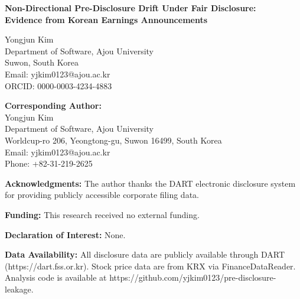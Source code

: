 \documentclass[12pt]{article}
\begin{document}
\begin{center}
{\Large\bfseries Non-Directional Pre-Disclosure Drift Under Fair Disclosure:\\Evidence from Korean Earnings Announcements}

\vspace{2cm}

{\large Yongjun Kim}\\[0.5cm]
Department of Software, Ajou University\\
Suwon, South Korea\\
Email: yjkim0123@ajou.ac.kr\\
ORCID: 0000-0003-4234-4883

\vspace{2cm}

\textbf{Corresponding Author:}\\
Yongjun Kim\\
Department of Software, Ajou University\\
Worldcup-ro 206, Yeongtong-gu, Suwon 16499, South Korea\\
Email: yjkim0123@ajou.ac.kr\\
Phone: +82-31-219-2625

\end{center}

\vfill

\noindent\textbf{Acknowledgments:} The author thanks the DART electronic disclosure system for providing publicly accessible corporate filing data.

\noindent\textbf{Funding:} This research received no external funding.

\noindent\textbf{Declaration of Interest:} None.

\noindent\textbf{Data Availability:} All disclosure data are publicly available through DART (https://dart.fss.or.kr). Stock price data are from KRX via FinanceDataReader. Analysis code is available at https://github.com/yjkim0123/pre-disclosure-leakage.
\end{document}
